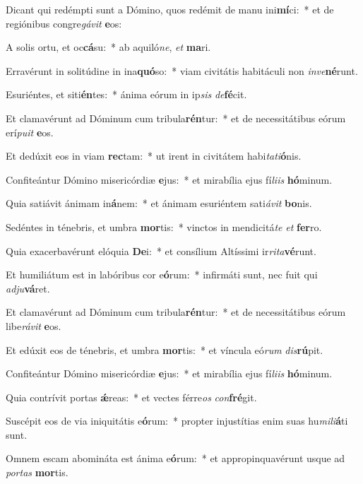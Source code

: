 \item Dicant qui redémpti sunt a Dómino, quos redémit de manu ini\textbf{mí}ci:~* et de regiónibus congre\textit{gá}\textit{vit} \textbf{e}os:
\item A solis ortu, et oc\textbf{cá}su:~* ab aquiló\textit{ne}, \textit{et} \textbf{ma}ri.
\item Erravérunt in solitúdine in ina\textbf{quó}so:~* viam civitátis habitáculi non \textit{in}\textit{ve}\textbf{né}runt.
\item Esuriéntes, et siti\textbf{én}tes:~* ánima eórum in ip\textit{sis} \textit{de}\textbf{fé}cit.
\item Et clamavérunt ad Dóminum cum tribula\textbf{rén}tur:~* et de necessitátibus eórum erí\textit{pu}\textit{it} \textbf{e}os.
\item Et dedúxit eos in viam \textbf{rec}tam:~* ut irent in civitátem habi\textit{ta}\textit{ti}\textbf{ó}nis.
\item Confiteántur Dómino misericórdiæ \textbf{e}jus:~* et mirabília ejus fí\textit{li}\textit{is} \textbf{hó}minum.
\item Quia satiávit ánimam in\textbf{á}nem:~* et ánimam esuriéntem sati\textit{á}\textit{vit} \textbf{bo}nis.
\item Sedéntes in ténebris, et umbra \textbf{mor}tis:~* vinctos in mendicitá\textit{te} \textit{et} \textbf{fer}ro.
\item Quia exacerbavérunt elóquia \textbf{De}i:~* et consílium Altíssimi ir\textit{ri}\textit{ta}\textbf{vé}runt.
\item Et humiliátum est in labóribus cor e\textbf{ó}rum:~* infirmáti sunt, nec fuit qui \textit{ad}\textit{ju}\textbf{vá}ret.
\item Et clamavérunt ad Dóminum cum tribula\textbf{rén}tur:~* et de necessitátibus eórum libe\textit{rá}\textit{vit} \textbf{e}os.
\item Et edúxit eos de ténebris, et umbra \textbf{mor}tis:~* et víncula eó\textit{rum} \textit{dis}\textbf{rú}pit.
\item Confiteántur Dómino misericórdiæ \textbf{e}jus:~* et mirabília ejus fí\textit{li}\textit{is} \textbf{hó}minum.
\item Quia contrívit portas \textbf{ǽ}reas:~* et vectes férre\textit{os} \textit{con}\textbf{fré}git.
\item Suscépit eos de via iniquitátis e\textbf{ó}rum:~* propter injustítias enim suas hu\textit{mi}\textit{li}\textbf{á}ti sunt.
\item Omnem escam abomináta est ánima e\textbf{ó}rum:~* et appropinquavérunt usque ad \textit{por}\textit{tas} \textbf{mor}tis.
